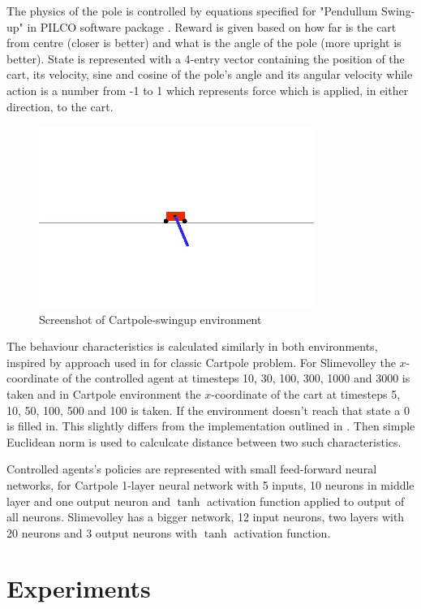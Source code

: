 The physics of the pole is controlled by equations specified for "Pendullum Swing-up" in PILCO software package \cite{pilco2013}. Reward is given based on how far is the cart from centre (closer is better) and what is the angle of the pole (more upright is better). State is represented with a 4-entry vector containing the position of the cart, its velocity, sine and cosine of the pole's angle and its angular velocity while action is a number from -1 to 1 which represents force which is applied, in either direction, to the cart.

\begin{figure}[h]
    \caption{Screenshot of Cartpole-swingup environment}
    \includegraphics[width=0.8\textwidth]{img/cartpole.png}
\end{figure}
% 
The behaviour characteristics is calculated similarly in both environments, inspired by approach used in \cite{Inden2013} for classic Cartpole problem. For Slimevolley the $x$-coordinate of the controlled agent at timesteps 10, 30, 100, 300, 1000 and 3000 is taken and in Cartpole environment the $x$-coordinate of the cart at timesteps 5, 10, 50, 100, 500 and 100 is taken. If the environment doesn't reach that state a 0 is filled in. This slightly differs from the implementation outlined in \cite{Inden2013}. Then simple Euclidean norm is used to calculcate distance between two such characteristics.

Controlled agents's policies are represented with small feed-forward neural networks, for Cartpole 1-layer neural network with 5 inputs, 10 neurons in middle layer and one output neuron and $\tanh$ activation function applied to output of all neurons. Slimevolley has a bigger network, 12 input neurons, two layers with 20 neurons and 3 output neurons with $\tanh$ activation function.

\section{Experiments}

